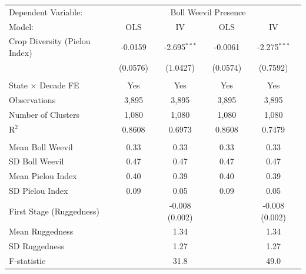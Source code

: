 \begingroup
\centering
\begin{tabular}{lcccc}
   \toprule \toprule
   Dependent Variable: & \multicolumn{4}{c}{Boll Weevil Presence} \\
   Model: & OLS & IV & OLS & IV \\
   \midrule
  Crop Diversity (Pielou Index) & -0.0159 & -2.695$^{***}$ & -0.0061 & -2.275$^{***}$ \\
  & (0.0576) & (1.0427) & (0.0574) & (0.7592) \\
   & & & & \\
   State $\times$ Decade FE        & Yes & Yes & Yes & Yes \\
   \midrule
  Observations & 3,895 & 3,895 & 3,895 & 3,895 \\
  Number of Clusters & 1,080 & 1,080 & 1,080 & 1,080 \\
  R$^2$ & 0.8608 & 0.6973 & 0.8608 & 0.7479 \\
   & & & & \\
  
  Mean Boll Weevil & 0.33 & 0.33 & 0.33 & 0.33 \\
  SD Boll Weevil & 0.47 & 0.47 & 0.47 & 0.47 \\
  Mean Pielou Index & 0.40 & 0.39 & 0.40 & 0.39 \\
  SD Pielou Index & 0.09 & 0.05 & 0.09 & 0.05 \\
   \midrule
  First Stage (Ruggedness) &  & -0.008 (0.002) &  & -0.008 (0.002) \\
  Mean Ruggedness &  & 1.34 &  & 1.34 \\
  SD Ruggedness &  & 1.27 &  & 1.27 \\
  F-statistic &  & 31.8 &  & 49.0 \\

   \bottomrule \bottomrule
\end{tabular}
\par\endgroup
